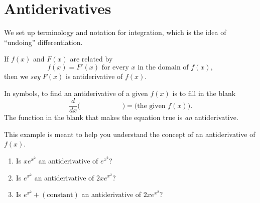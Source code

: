 \documentclass[../main.tex]{subfiles}
\begin{document}
 \section{Antiderivatives}
We set up terminology and notation for integration, which is the idea of \enquote{undoing} differentiation.

\begin{definition} \label{def:antiderivative}
  If \(f(x)\) and \(F(x)\) are related by
  \[
    f(x) = F'(x) \text{ for every } x \text{ in the domain of } f(x),
  \]
  then we \emph{say} \(F(x)\) is  antiderivative of \(f(x)\).
\end{definition}

\faStar{} In symbols, to find an antiderivative of a given \(f(x)\) is to fill in the blank 
\[
  \frac{d}{dx}\bigg( \hspace{1in} \bigg) = \text{(the given \(f(x)\))}.
\]
The function in the blank that makes the equation true is \emph{an} antiderivative.

\begin{example}
  This example is meant to help you understand the concept of an antiderivative of \(f(x)\).

  \begin{enumerate}[wide]
    \item Is \(xe^{x^{2}}\) an antiderivative of \(e^{x^{2}}\)?

      \blanks*

    \item Is \(e^{x^{2}}\) an antiderivative of \(2xe^{x^{2}}\)?

      \blanks*

    \item Is \(e^{x^{2}} + (\text{constant})\) an antiderivative of \(2xe^{x^{2}}\)?

      \blanks*
  \end{enumerate}
\end{example}


\clearpage

%
%
\end{document}
